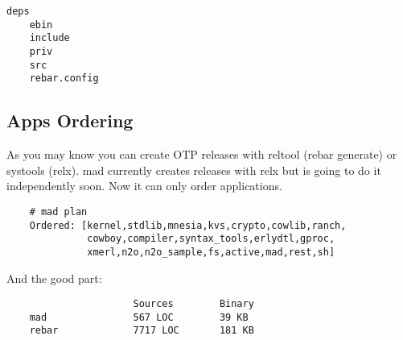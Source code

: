 \begin{lstlisting}[caption=OTP Application]
    deps
    ebin
    include
    priv
    src
    rebar.config
\end{lstlisting}

\subsection{Apps Ordering}

As you may know you can create OTP releases with
reltool (rebar generate) or systools (relx). mad currently
creates releases with relx but is going to do it independently soon.
Now it can only order applications.

\begin{lstlisting}
    # mad plan
    Ordered: [kernel,stdlib,mnesia,kvs,crypto,cowlib,ranch,
              cowboy,compiler,syntax_tools,erlydtl,gproc,
              xmerl,n2o,n2o_sample,fs,active,mad,rest,sh]
\end{lstlisting}

And the good part:

\begin{lstlisting}
                      Sources        Binary
    mad               567 LOC        39 KB
    rebar             7717 LOC       181 KB
\end{lstlisting}
